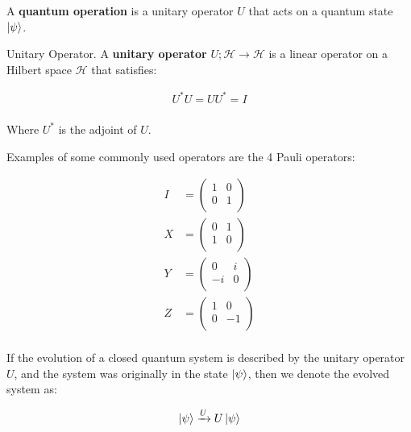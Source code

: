 A \textbf{quantum operation} is a unitary operator $U$ that acts on a quantum state $\ket{\psi}$.

\begin{definition}{Unitary Operator.}
    A \textbf{unitary operator} $U;\mathcal{H} \to \mathcal{H}$ is a linear operator on a Hilbert space $\mathcal{H}$ that satisfies:
    
    \begin{align*}
        U^*U = UU^* = I \\ 
    \end{align*}
    
    Where $U^*$ is the adjoint of $U$.
\end{definition}

Examples of some commonly used operators are the 4 Pauli operators:

\begin{align*}
    I &= \begin{pmatrix}
        1 & 0 \\ 
        0 & 1 \\ 
    \end{pmatrix} \\ 
    X &= \begin{pmatrix}
        0 & 1 \\ 
        1 & 0 \\ 
    \end{pmatrix} \\ 
    Y &= \begin{pmatrix}
        0 & i \\ 
        -i & 0 \\ 
    \end{pmatrix} \\ 
    Z &= \begin{pmatrix}
        1 & 0 \\ 
        0 & -1 \\ 
    \end{pmatrix} \\ 
\end{align*}

If the evolution of a closed quantum system is described by the unitary operator $U$, and the system was originally in the state $\ket{\psi}$, then we denote the evolved system as:

\begin{align*}
    \ket{\psi} \xrightarrow{U} U \ket{\psi} \\    
\end{align*}

